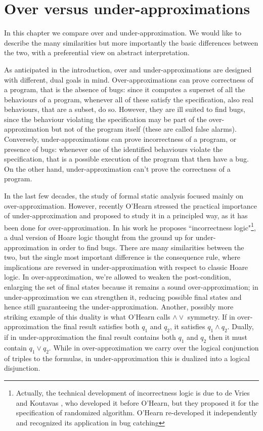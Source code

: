 \chapter{Over versus under-approximations}
In this chapter we compare over and under-approximation. We would like to describe the many similarities but more importantly the basic differences between the two, with a preferential view on abstract interpretation.

As anticipated in the introduction, over and under-approximations are designed with different, dual goals in mind.
Over-approximations can prove correctness of a program, that is the absence of bugs: since it computes a superset of all the behaviours of a program, whenever all of these satisfy the specification, also real behaviours, that are a subset, do so. However, they are ill suited to find bugs, since the behaviour violating the specification may be part of the over-approximation but not of the program itself (these are called false alarms).
Conversely, under-approximations can prove incorrectness of a program, or presence of bugs: whenever one of the identified behaviours violate the specification, that is a possible execution of the program that then have a bug. On the other hand, under-approximation can't prove the correctness of a program.

In the last few decades, the study of formal static analysis focused mainly on over-approximation. However, recently O'Hearn \cite{ohearn-incorrectness-logic} stressed the practical importance of under-approximation and proposed to study it in a principled way, as it has been done for over-approximation.
In his work he proposes ``incorrectness logic"\footnote{Actually, the technical development of incorrectness logic is due to de Vries and Koutavas \cite{de-vries-koutavas-reverse-hoare-logic}, who developed it before O'Hearn, but they proposed it for the specification of randomized algorithm. O'Hearn re-developed it independently and recognized its application in bug catching}, a dual version of Hoare logic thought from the ground up for under-approximation in order to find bugs. There are many similarities between the two, but the single most important difference is the consequence rule, where implications are reversed in under-approximation with respect to classic Hoare logic. In over-approximation, we're allowed to weaken the post-condition, enlarging the set of final states because it remains a sound over-approximation; in under-approximation we can strengthen it, reducing possible final states and hence still guaranteeing the under-approximation.
Another, possibly more striking example of this duality is what O'Hearn calls $\land \lor$ symmetry. If in over-approximation the final result satisfies both $q_1$ and $q_2$, it satisfies $q_1 \land q_2$. Dually, if in under-approximation the final result contains both $q_1$ and $q_2$ then it must contain $q_1 \lor q_2$. While in over-approximation we carry over the logical conjunction of triples to the formulas, in under-approximation this is dualized into a logical disjunction.

